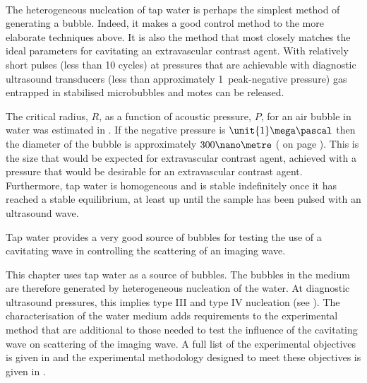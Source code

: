 {\item[Heterogeneous nucleation of tap water:]\hfill \\
  The heterogeneous nucleation of tap water is perhaps the simplest method of generating a bubble.
  Indeed, it makes a good control method to the more elaborate techniques above.
  It is also the method that most closely matches the ideal parameters for cavitating an extravascular contrast agent.
  With relatively short pulses (less than 10 cycles) at pressures that are achievable with diagnostic ultrasound transducers 
  (less than approximately \unit{1}\mega\pascal\ peak-negative pressure)
  gas entrapped in stabilised microbubbles and motes can be released.
  
  The critical radius, $R$, as a function of acoustic pressure, $P$, for an air bubble in water was estimated in .
  If the negative pressure is  $\unit{1}\mega\pascal$ then the diameter of the bubble is approximately $300\nano\metre$
(\figref{} on page \pageref{}).
  This is the size that would be expected for extravascular contrast agent,
  achieved with a pressure that would be desirable for an extravascular contrast agent.
  Furthermore, tap water is homogeneous and is stable indefinitely once it has reached a stable equilibrium,
  at least up until the sample has been pulsed with an ultrasound wave.
  
  Tap water provides a very good source of bubbles for testing the use of a cavitating wave in controlling the scattering of an imaging wave.
}  
This chapter uses tap water as a source of bubbles.
The bubbles in the medium are therefore generated by heterogeneous nucleation of the water.
At diagnostic ultrasound pressures, 
this implies type III and type IV nucleation (see  ).
The characterisation of the water medium adds 
requirements to the experimental method
that are additional to those needed to test the influence of the cavitating wave on scattering of the imaging wave.
A full list of the experimental objectives is given in  
and the experimental methodology designed to meet these objectives is given in .




